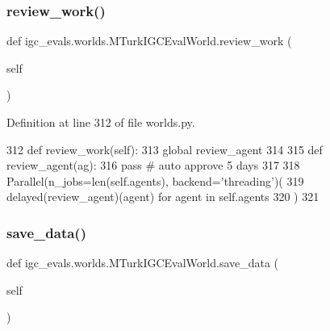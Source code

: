 \mbox{\label{classigc__evals_1_1worlds_1_1MTurkIGCEvalWorld_aa3a8ea3999f002288078223aa079d76d}} 
\subsubsection{\texorpdfstring{review\+\_\+work()}{review\_work()}}
{\footnotesize\ttfamily def igc\+\_\+evals.\+worlds.\+M\+Turk\+I\+G\+C\+Eval\+World.\+review\+\_\+work (\begin{DoxyParamCaption}\item[{}]{self }\end{DoxyParamCaption})}



Definition at line 312 of file worlds.\+py.


\begin{DoxyCode}
312     \textcolor{keyword}{def }review\_work(self):
313         \textcolor{keyword}{global} review\_agent
314 
315         \textcolor{keyword}{def }review\_agent(ag):
316             \textcolor{keywordflow}{pass}  \textcolor{comment}{# auto approve 5 days}
317 
318         Parallel(n\_jobs=len(self.agents), backend=\textcolor{stringliteral}{'threading'})(
319             delayed(review\_agent)(agent) \textcolor{keywordflow}{for} agent \textcolor{keywordflow}{in} self.agents
320         )
321 
\end{DoxyCode}
\mbox{\label{classigc__evals_1_1worlds_1_1MTurkIGCEvalWorld_a63d2d41442d28373315a58c1d70686b3}} 
\subsubsection{\texorpdfstring{save\+\_\+data()}{save\_data()}}
{\footnotesize\ttfamily def igc\+\_\+evals.\+worlds.\+M\+Turk\+I\+G\+C\+Eval\+World.\+save\+\_\+data (\begin{DoxyParamCaption}\item[{}]{self }\end{DoxyParamCaption})}



